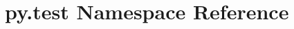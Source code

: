 \hypertarget{namespacepy_1_1test}{}\section{py.\+test Namespace Reference}
\label{namespacepy_1_1test}
